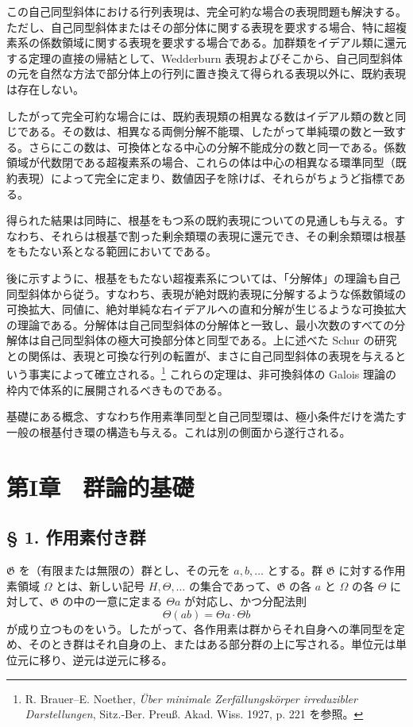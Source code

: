 \documentclass[11pt]{article}
\providecommand{\mG}{\mathfrak{G}}
\begin{document}
この自己同型斜体における行列表現は、完全可約な場合の表現問題も解決する。ただし、自己同型斜体またはその部分体に関する表現を要求する場合、特に超複素系の係数領域に関する表現を要求する場合である。加群類をイデアル類に還元する定理の直接の帰結として、Wedderburn 表現およびそこから、自己同型斜体の元を自然な方法で部分体上の行列に置き換えて得られる表現以外に、既約表現は存在しない。

したがって完全可約な場合には、既約表現類の相異なる数はイデアル類の数と同じである。その数は、相異なる両側分解不能環、したがって単純環の数と一致する。さらにこの数は、可換体となる中心の分解不能成分の数と同一である。係数領域が代数閉である超複素系の場合、これらの体は中心の相異なる環準同型（既約表現）によって完全に定まり、数値因子を除けば、それらがちょうど指標である。

得られた結果は同時に、根基をもつ系の既約表現についての見通しも与える。すなわち、それらは根基で割った剰余類環の表現に還元でき、その剰余類環は根基をもたない系となる範囲においてである。

後に示すように、根基をもたない超複素系については、「分解体」の理論も自己同型斜体から従う。すなわち、表現が絶対既約表現に分解するような係数領域の可換拡大、同値に、絶対単純な右イデアルへの直和分解が生じるような可換拡大の理論である。分解体は自己同型斜体の分解体と一致し、最小次数のすべての分解体は自己同型斜体の極大可換部分体と同型である。上に述べた Schur の研究との関係は、表現と可換な行列の転置が、まさに自己同型斜体の表現を与えるという事実によって確立される。\footnote{R. Brauer--E. Noether, \emph{Über minimale Zerfällungskörper irreduzibler Darstellungen}, Sitz.-Ber. Preuß. Akad. Wiss. 1927, p. 221 を参照。} これらの定理は、非可換斜体の Galois 理論の枠内で体系的に展開されるべきものである。

基礎にある概念、すなわち作用素準同型と自己同型環は、極小条件だけを満たす一般の根基付き環の構造も与える。これは別の側面から遂行される。

\section*{第I章　群論的基礎}

\subsection*{§ 1. 作用素付き群}

$\mG$ を（有限または無限の）群とし、その元を $a,b,\ldots$ とする。群 $\mG$ に対する作用素領域 $\Omega$ とは、新しい記号 $H,\Theta,\ldots$ の集合であって、$\mG$ の各 $a$ と $\Omega$ の各 $\Theta$ に対して、$\mG$ の中の一意に定まる $\Theta a$ が対応し、かつ分配法則
\[
        \Theta(ab)=\Theta a\cdot\Theta b
\]
が成り立つものをいう。したがって、各作用素は群からそれ自身への準同型を定め、そのとき群はそれ自身の上、またはある部分群の上に写される。単位元は単位元に移り、逆元は逆元に移る。
\end{document}
